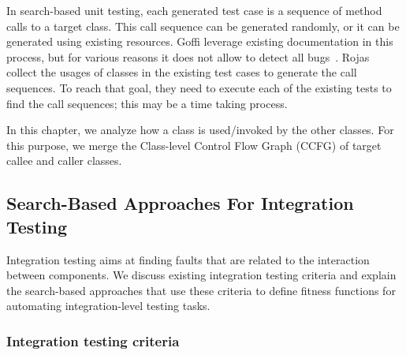 In search-based unit testing, each generated test case is a sequence of method calls to a target class. This call sequence can be generated randomly, or it can be generated using existing resources. Goffi \etal \cite{Goffi2016} leverage existing documentation in this process, but for various reasons it does not allow to detect all bugs~\cite{robillard2011,blasi2018,zhou2017}.
Rojas \etal~\cite{Rojas2016} collect the usages of classes in the existing test cases to generate the call sequences. To reach that goal, they need to execute each of the existing tests to find the call sequences; this may be a time taking process.

In this chapter, we analyze how a class is used/invoked by the other classes. For this purpose, we merge the Class-level Control Flow Graph (CCFG) of target callee and caller classes.




\subsection{Search-Based Approaches For Integration Testing}

Integration testing aims at finding faults that are related to the interaction between components.
We discuss existing integration testing criteria and explain the search-based approaches that use these criteria to define fitness functions for automating integration-level testing tasks.

\subsubsection{Integration testing criteria}
\label{sec:background-integ-testing-criteria}

